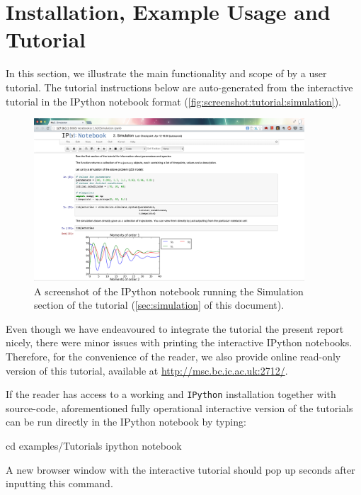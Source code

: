 \section{Installation, Example Usage and Tutorial} \label{examples}

In this section, we illustrate the main functionality and scope of \means{} by a user tutorial.
The tutorial instructions below are auto-generated from the interactive tutorial in the IPython notebook format (\autoref{fig:screenshot:tutorial:simulation}).

\begin{figure}[ht]
    \centering
    \includegraphics[width=0.9\textwidth]{handmade_figures/tutorial-screenshot.png}
    \caption{A screenshot of the IPython notebook running the Simulation section of the tutorial (\autoref{sec:simulation} of this document).}
    \label{fig:screenshot:tutorial:simulation}
\end{figure}


Even though we have endeavoured to integrate the tutorial the present report nicely,
there were minor issues with printing the interactive IPython notebooks.
Therefore, for the convenience of the reader, we also provide online read-only version of this tutorial,
available at \url{http://msc.bc.ic.ac.uk:2712/}.

If the reader has access to a working \means{} and \verb"IPython" installation together with \means{} source-code,
aforementioned fully operational interactive version of the tutorials can be run directly in the IPython notebook by typing:

\begin{InputVerbatim}
cd examples/Tutorials
ipython notebook
\end{InputVerbatim}

A new browser window with the interactive tutorial should pop up seconds after inputting this command.

